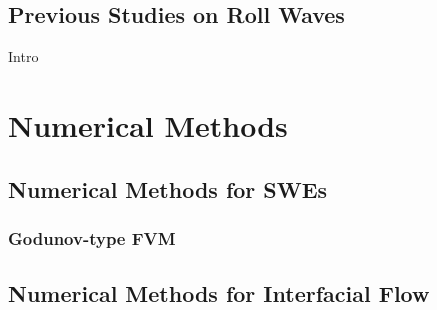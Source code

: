 \documentclass[USenglish, mathserif]{beamer}
\def\red{\textcolor{red}}
\numberwithin{equation}{section}
\numberwithin{figure}{section}
\begin{document}
\subsection{Previous Studies on Roll Waves}
\begin{frame}{Intro}


\end{frame}


%
 



\section{Numerical Methods}
\subsection{Numerical Methods for SWEs}
\subsubsection{Godunov-type FVM}
\subsection{Numerical Methods for Interfacial Flow}
\end{document}
